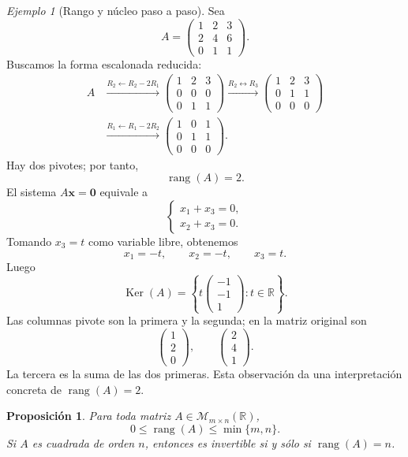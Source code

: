 \documentclass[12pt]{article}
\newtheorem{proposicion}[definicion]{Proposición}
\theoremstyle{remark}
\newtheorem{ejemplo}[definicion]{Ejemplo}
\newcommand{\R}{\mathbb{R}}
\newcommand{\Mat}[2]{\mathcal{M}_{#1\times #2}}
\newcommand{\rang}{\operatorname{rang}}
\newcommand{\Ker}{\operatorname{Ker}}
\newcommand{\vect}[1]{\boldsymbol{#1}}
\begin{document}
\begin{ejemplo}[Rango y núcleo paso a paso]
Sea
\[
A=\begin{pmatrix}1&2&3\\2&4&6\\0&1&1\end{pmatrix}.
\]
Buscamos la forma escalonada reducida:
\begin{align*}
A&\xrightarrow{R_2\leftarrow R_2-2R_1}
\begin{pmatrix}1&2&3\\0&0&0\\0&1&1\end{pmatrix}
\xrightarrow{R_2\leftrightarrow R_3}
\begin{pmatrix}1&2&3\\0&1&1\\0&0&0\end{pmatrix}\\[1ex]
&\xrightarrow{R_1\leftarrow R_1-2R_2}
\begin{pmatrix}1&0&1\\0&1&1\\0&0&0\end{pmatrix}.
\end{align*}
Hay dos pivotes; por tanto,
\[\boxed{\rang(A)=2.}\]
El sistema $A\vect{x}=\vect{0}$ equivale a
\[
\begin{cases}
x_1+x_3=0,\\x_2+x_3=0.
\end{cases}
\]
Tomando $x_3=t$ como variable libre, obtenemos
\[
x_1=-t,\qquad x_2=-t,\qquad x_3=t.
\]
Luego
\[
\boxed{\Ker(A)=\left\{t\begin{pmatrix}-1\\-1\\1\end{pmatrix}:t\in\R\right\}.}
\]
Las columnas pivote son la primera y la segunda; en la matriz original son
\[
\begin{pmatrix}1\\2\\0\end{pmatrix},\qquad
\begin{pmatrix}2\\4\\1\end{pmatrix}.
\]
La tercera es la suma de las dos primeras. Esta observación da una interpretación concreta de $\rang(A)=2$.
\end{ejemplo}

\begin{proposicion}
Para toda matriz $A\in\Mat{m}{n}(\R)$,
\[
0\le\rang(A)\le\min\{m,n\}.
\]
Si $A$ es cuadrada de orden $n$, entonces es invertible si y sólo si $\rang(A)=n$.
\end{proposicion}
\end{document}
